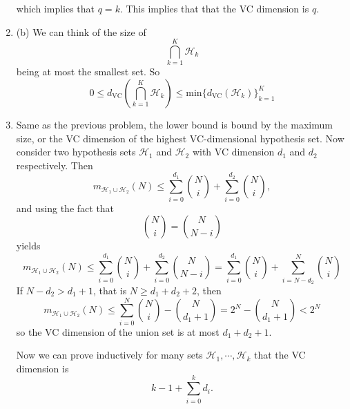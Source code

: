 \documentclass[12pt]{article}
\begin{document}
\begin{enumerate}[leftmargin=*]
which implies that $q = k$. This implies that that the VC dimension is $q$.
\item (b) We can think of the size of
\[ \bigcap_{k=1}^K \mathcal H_k \]
being at most the smallest set. So
\[ 0 \leq d_{\text{VC}} \left(\bigcap_{k=1}^K \mathcal H_k \right) \leq \text{min} \{ d_{\text{VC}} (\mathcal H_k)\}_{k=1}^K \]
\item Same as the previous problem, the lower bound is bound by the maximum size, or the VC dimension of the highest VC-dimensional hypothesis set. Now consider two hypothesis sets $\mathcal H_1$ and $\mathcal H_2$ with VC dimension $d_1$ and $d_2$ respectively. Then
\[ m_{\mathcal H_1 \cup \mathcal H_2}(N) \leq \sum_{i = 0}^{d_1} \binom{N}{i} + \sum_{i = 0}^{d_2} \binom{N}{i}, \]
and using the fact that
\[ \binom{N}{i} = \binom{N}{N - i} \]
yields
\[ m_{\mathcal H_1 \cup \mathcal H_2}(N) \leq \sum_{i=0}^{d_1} \binom{N}{i} + \sum_{i=0}^{d_2} \binom{N}{N - i} = \sum_{i=0}^{d_1} \binom{N}{i} + \sum_{i = N - d_2}^N \binom{N}{i} \]
If $N - d_2 > d_1 + 1$, that is $N \geq d_1 + d_2 + 2$, then
\[ m_{\mathcal H_1 \cup \mathcal H_2}(N) \leq \sum_{i=0}^N \binom{N}{i} - \binom{N}{d_1 + 1} = 2^N - \binom{N}{d_1 + 1} < 2^N \]
so the VC dimension of the union set is at most $d_1 + d_2 + 1$.

Now we can prove inductively for many sets $\mathcal H_1, \cdots, \mathcal H_k$ that the VC dimension is
\[ k - 1 + \sum_{i=0}^k d_i. \]
\end{enumerate}
\end{document}
